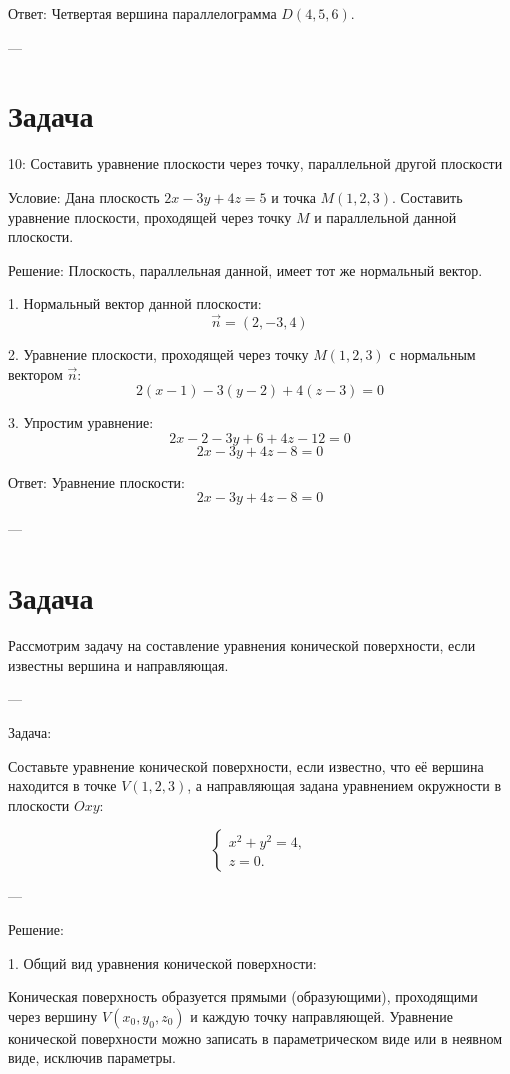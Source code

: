 \documentclass[a4paper,14pt]{extreport} %
\begin{document}
 Ответ:   
Четвертая вершина параллелограмма \( D(4, 5, 6) \).

---

    \section*{Задача}10: Составить уравнение плоскости через точку, параллельной другой плоскости

 Условие:   
Дана плоскость \( 2x - 3y + 4z = 5 \) и точка \( M(1, 2, 3) \).  
Составить уравнение плоскости, проходящей через точку \( M \) и параллельной данной плоскости.

 Решение:   
Плоскость, параллельная данной, имеет тот же нормальный вектор.

1. Нормальный вектор данной плоскости:
   \[
   \vec{n} = (2, -3, 4)
   \]

2. Уравнение плоскости, проходящей через точку \( M(1, 2, 3) \) с нормальным вектором \( \vec{n} \):
   \[
   2(x - 1) - 3(y - 2) + 4(z - 3) = 0
   \]

3. Упростим уравнение:
   \[
   2x - 2 - 3y + 6 + 4z - 12 = 0
   \]
   \[
   2x - 3y + 4z - 8 = 0
   \]

 Ответ:   
Уравнение плоскости:
\[
2x - 3y + 4z - 8 = 0
\]

---
\section*{Задача}
Рассмотрим задачу на составление уравнения конической поверхности, если известны вершина и направляющая.

---

 Задача: 

Составьте уравнение конической поверхности, если известно, что её вершина находится в точке \( V(1, 2, 3) \), а направляющая задана уравнением окружности в плоскости \( Oxy \):

\[
\begin{cases}
x^2 + y^2 = 4, \\
z = 0.
\end{cases}
\]

---

 Решение: 

1.  Общий вид уравнения конической поверхности: 

   Коническая поверхность образуется прямыми (образующими), проходящими через вершину \( V(x_0, y_0, z_0) \) и каждую точку направляющей. Уравнение конической поверхности можно записать в параметрическом виде или в неявном виде, исключив параметры.
\end{document}
